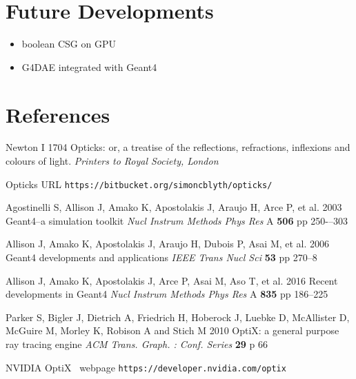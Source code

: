 \documentclass[a4paper]{jpconf}
\begin{document}
\section{Future Developments}

\begin{itemize}
\item boolean CSG on GPU
\item G4DAE integrated with Geant4
\end{itemize}





\section*{References}
\begin{thebibliography}{9}

Newton I 
1704 
Opticks: or, a treatise of the reflections, refractions, inflexions and colours of light.
{\it Printers to Royal Society, London} 

Opticks URL {\tt https://bitbucket.org/simoncblyth/opticks/}


Agostinelli S, Allison J, Amako K, Apostolakis J, Araujo H, Arce P, et al. 
2003  
Geant4--a simulation toolkit 
{\it Nucl Instrum Methods Phys Res} A {\bf 506} pp 250-–303 

Allison J, Amako K, Apostolakis J, Araujo H, Dubois P, Asai M, et al. 
2006 
Geant4 developments and applications 
{\it IEEE Trans Nucl Sci} {\bf 53} pp 270--8

Allison J, Amako K, Apostolakis J, Arce P, Asai M, Aso T, et al. 
2016 
Recent developments in Geant4 
{\it Nucl Instrum Methods Phys Res} A {\bf 835} pp 186--225




Parker S, Bigler J, Dietrich A, Friedrich H, Hoberock J, Luebke D, McAllister D, McGuire M, Morley K, Robison A and Stich M 
2010 
OptiX: a general purpose ray tracing engine
{\it ACM Trans. Graph. : Conf. Series} {\bf 29} p 66 

NVIDIA{\textregistered} OptiX\texttrademark~ webpage {\tt https://developer.nvidia.com/optix}








\end{thebibliography}
\end{document}
